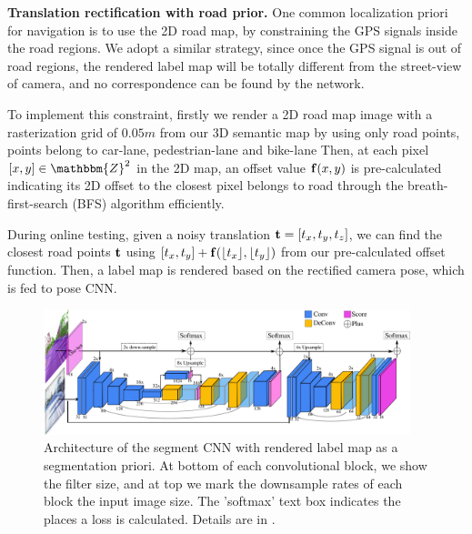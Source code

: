 \textbf{Translation rectification with road prior.} One common localization priori for navigation is to use the 2D road map, by constraining the GPS signals inside the road regions. We adopt a similar strategy, since once the GPS signal is out of road regions, the rendered label map will be totally different from the street-view of camera, and no correspondence can be found by the network.

To implement this constraint, firstly we render a 2D road map image with a rasterization grid of $0.05m$ from our 3D semantic map by using only road points, \ie points belong to car-lane, pedestrian-lane and bike-lane \etc
Then, at each pixel $[x, y] \in \mathbbm{Z}^2$ in the 2D map, an offset value ${\mathbf f}(x, y)$ is pre-calculated indicating its 2D offset to the closest pixel belongs to road through the breath-first-search (BFS) algorithm efficiently.

During online testing, given a noisy translation ${\mathbf t}=[t_x, t_y, t_z]$, we can find the closest road points \wrt ${\mathbf t}$ using $[t_x, t_y] + {\mathbf f}(\lfloor t_x \rfloor, \lfloor t_y \rfloor)$ from our pre-calculated offset function. Then, a label map is rendered based on the rectified camera pose, which is fed to pose CNN.

\begin{figure}[t]
\center
\vspace{-0.6\baselineskip}
\includegraphics[width=0.95\textwidth]{fig/segCNN.pdf}
\caption{Architecture of the segment CNN with rendered label map as a segmentation priori. At bottom of each convolutional block, we show the filter size, and at top we mark the downsample rates of each block \wrt the input image size. The 'softmax' text box indicates the places a loss is calculated. Details are in .}
\label{fig:segnet}
\vspace{-1.35\baselineskip}
\end{figure}

